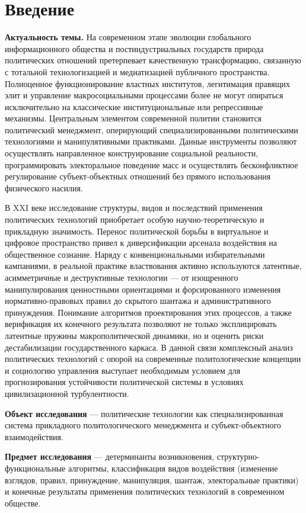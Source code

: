 \section*{Введение}

\textbf{Актуальность темы.} На современном этапе эволюции глобального информационного общества и постиндустриальных государств природа политических отношений претерпевает качественную трансформацию, связанную с тотальной технологизацией и медиатизацией публичного пространства. Полноценное функционирование властных институтов, легитимация правящих элит и управление макросоциальными процессами более не могут опираться исключительно на классические институциональные или репрессивные механизмы. Центральным элементом современной политии становится политический менеджмент, оперирующий специализированными политическими технологиями и манипулятивными практиками. Данные инструменты позволяют осуществлять направленное конструирование социальной реальности, программировать электоральное поведение масс и осуществлять бесконфликтное регулирование субъект-объектных отношений без прямого использования физического насилия.

В XXI веке исследование структуры, видов и последствий применения политических технологий приобретает особую научно-теоретическую и прикладную значимость. Перенос политической борьбы в виртуальное и цифровое пространство привел к диверсификации арсенала воздействия на общественное сознание. Наряду с конвенциональными избирательными кампаниями, в реальной практике властвования активно используются латентные, асимметричные и деструктивные технологии — от изощренного манипулирования ценностными ориентациями и форсированного изменения нормативно-правовых правил до скрытого шантажа и административного принуждения. Понимание алгоритмов проектирования этих процессов, а также верификация их конечного результата позволяют не только эксплицировать латентные пружины макрополитической динамики, но и оценить риски дестабилизации государственного каркаса. В данной связи комплексный анализ политических технологий с опорой на современные политологические концепции и социологию управления выступает необходимым условием для прогнозирования устойчивости политической системы в условиях цивилизационной турбулентности.

\textbf{Объект исследования} — политические технологии как специализированная система прикладного политологического менеджмента и субъект-объектного взаимодействия.

\textbf{Предмет исследования} — детерминанты возникновения, структурно-функциональные алгоритмы, классификация видов воздействия (изменение взглядов, правил, принуждение, манипуляция, шантаж, электоральные практики) и конечные результаты применения политических технологий в современном обществе.

